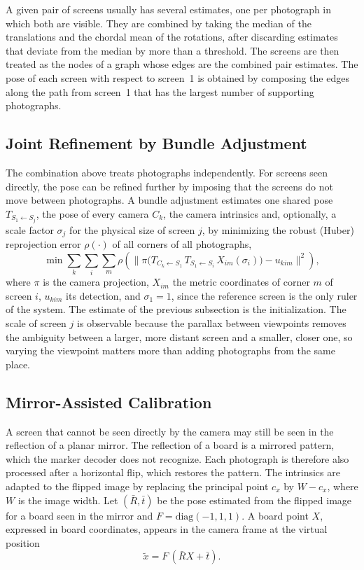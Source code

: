 \documentclass[english,hidelinks]{sbrt}
\begin{document}
A given pair of screens usually has several estimates, one per photograph in which both are visible. They are combined by taking the median of the translations and the chordal mean of the rotations, after discarding estimates that deviate from the median by more than a threshold. The screens are then treated as the nodes of a graph whose edges are the combined pair estimates. The pose of each screen with respect to screen~1 is obtained by composing the edges along the path from screen~1 that has the largest number of supporting photographs.

\subsection{Joint Refinement by Bundle Adjustment}
\label{sec:ba}
The combination above treats photographs independently. For screens seen directly, the pose can be refined further by imposing that the screens do not move between photographs. A bundle adjustment estimates one shared pose $T_{S_1\leftarrow S_j}$, the pose of every camera $C_k$, the camera intrinsics and, optionally, a scale factor $\sigma_j$ for the physical size of screen $j$, by minimizing the robust (Huber) reprojection error $\rho(\cdot)$ of all corners of all photographs,
\begin{equation}
\min \sum_{k}\sum_{i}\sum_{m} \rho\!\left(\big\|\pi\big(T_{C_k\leftarrow S_1}\,T_{S_1\leftarrow S_i}\,X_{im}(\sigma_i)\big)-u_{kim}\big\|^2\right),
\label{eq:ba}
\end{equation}
where $\pi$ is the camera projection, $X_{im}$ the metric coordinates of corner $m$ of screen $i$, $u_{kim}$ its detection, and $\sigma_1=1$, since the reference screen is the only ruler of the system. The estimate of the previous subsection is the initialization. The scale of screen $j$ is observable because the parallax between viewpoints removes the ambiguity between a larger, more distant screen and a smaller, closer one, so varying the viewpoint matters more than adding photographs from the same place.

\subsection{Mirror-Assisted Calibration}
A screen that cannot be seen directly by the camera may still be seen in the reflection of a planar mirror. The reflection of a board is a mirrored pattern, which the marker decoder does not recognize. Each photograph is therefore also processed after a horizontal flip, which restores the pattern. The intrinsics are adapted to the flipped image by replacing the principal point $c_x$ by $W - c_x$, where $W$ is the image width. Let $(\bar R, \bar t)$ be the pose estimated from the flipped image for a board seen in the mirror and $F = \mathrm{diag}(-1, 1, 1)$. A board point $X$, expressed in board coordinates, appears in the camera frame at the virtual position
\begin{equation}
\tilde x = F\,(\bar R X + \bar t).
\label{eq:virtual}
\end{equation}
\end{document}
